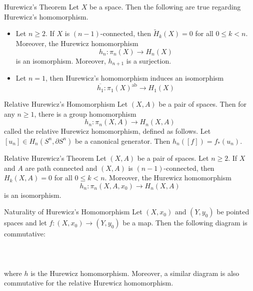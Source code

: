 \documentclass[a4paper]{article}
\begin{document}
\begin{thm}{Hurewicz's Theorem}{} Let $X$ be a space. Then the following are true regarding Hurewicz's homomorphism. 
\begin{itemize}
\item Let $n\geq 2$. If $X$ is $(n-1)$-connected, then $\widetilde{H}_k(X)=0$ for all $0\leq k<n$. Moreover, the Hurewicz homomorphism $$h_n:\pi_n(X)\to H_n(X)$$ is an isomorphism. Moreover, $h_{n+1}$ is a surjection. 
\item Let $n=1$, then Hurewicz's homomorphism induces an isomorphism $$\overline{h_1}:\pi_1(X)^\text{ab}\to H_1(X)$$ 
\end{itemize}
\end{thm}

\begin{thm}{Relative Hurewicz's Homomorphism}{} Let $(X,A)$ be a pair of spaces. Then for any $n\geq 1$, there is a group homomorphism $$h_n:\pi_n(X,A)\to H_n(X,A)$$ called the relative Hurewicz homomorphism, defined as follows. Let $[u_n]\in H_n(S^n,\partial S^n)$ be a canonical generator. Then $h_n([f])=f_\ast(u_n)$. 
\end{thm}

\begin{thm}{Relative Hurewicz's Theorem}{} Let $(X,A)$ be a pair of spaces. Let $n\geq 2$. If $X$ and $A$ are path connected and $(X,A)$ is $(n-1)$-connected, then $H_k(X,A)=0$ for all $0\leq k<n$. Moreover, the Hurewicz homomorphism $$h_n:\pi_n(X,A,x_0)\to H_n(X,A)$$ is an isomorphism. 
\end{thm}

\begin{thm}{Naturality of Hurewicz's Homomorphism}{} Let $(X,x_0)$ and $(Y,y_0)$ be pointed spaces and let $f:(X,x_0)\to(Y,y_0)$ be a map. Then the following diagram is commutative: \\~\\
\\~\\
where $h$ is the Hurewicz homomorphism. Moreover, a similar diagram is also commutative for the relative Hurewicz homomorphism. 
\end{thm}
\end{document}
